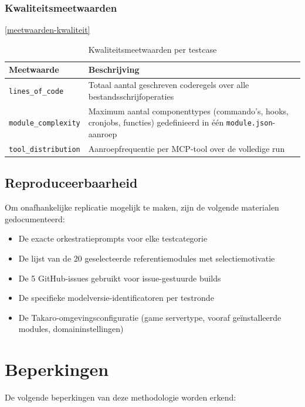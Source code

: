 \subsubsection{Kwaliteitsmeetwaarden}
\ref{meetwaarden-kwaliteit}
\begin{table}[h]
\centering
\begin{tabular}{lp{9cm}}
\hline
\textbf{Meetwaarde} & \textbf{Beschrijving} \\
\hline
\texttt{lines\_of\_code} & Totaal aantal geschreven coderegels over alle bestandsschrijfoperaties \\
\texttt{module\_complexity} & Maximum aantal componenttypes (commando’s, hooks, cronjobs, functies) gedefinieerd in één \texttt{module.json}-aanroep \\
\texttt{tool\_distribution} & Aanroepfrequentie per MCP-tool over de volledige run \\
\hline
\end{tabular}
\caption{Kwaliteitsmeetwaarden per testcase}\label{tab:meetwaarden-kwaliteit}
\end{table}

\subsection{Reproduceerbaarheid}\label{subsec:reproduceerbaarheid}

Om onafhankelijke replicatie mogelijk te maken, zijn de volgende materialen gedocumenteerd:

\begin{itemize}
    \item De exacte orkestratieprompts voor elke testcategorie
    \item De lijst van de 20 geselecteerde referentiemodules met selectiemotivatie
    \item De 5 GitHub-issues gebruikt voor issue-gestuurde builds
    \item De specifieke modelversie-identificatoren per testronde
    \item De Takaro-omgevingsconfiguratie (game servertype, vooraf geïnstalleerde modules, domaininstellingen)
\end{itemize}

\section{Beperkingen}\label{sec:beperkingen}

De volgende beperkingen van deze methodologie worden erkend:

